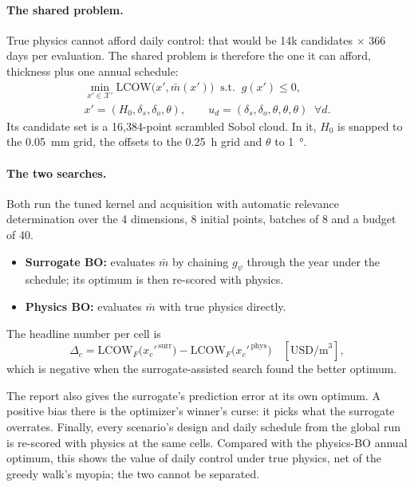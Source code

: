 \documentclass[11pt]{article}
\begin{document}
\paragraph{The shared problem.} True physics cannot afford daily control: that would be
14k candidates $\times$ 366 days per evaluation. The shared problem is therefore the one it
can afford, thickness plus one annual schedule:
\begin{equation}
\begin{gathered}
\min_{x' \in \mathcal{X}'} \mathrm{LCOW}\bigl(x', \bar m(x')\bigr) \;\;\text{s.t.}\;\; g(x') \le 0, \\
x' = (H_0, \delta_s, \delta_o, \theta), \qquad u_d = (\delta_s, \delta_o, \theta, \theta, \theta)\;\; \forall d .
\end{gathered}
\end{equation}
Its candidate set is a 16,384-point scrambled Sobol cloud. In it, $H_0$ is snapped to the
\SI{0.05}{\milli\metre} grid, the offsets to the \SI{0.25}{\hour} grid and $\theta$ to
\SI{1}{\degree}.

\paragraph{The two searches.} Both run the tuned kernel and acquisition with automatic
relevance determination over the 4 dimensions, 8 initial points, batches of 8 and a budget of
40.
\begin{itemize}
\item \textbf{Surrogate BO:} evaluates $\bar m$ by chaining $g_\psi$ through the year under the
schedule; its optimum is then re-scored with physics.
\item \textbf{Physics BO:} evaluates $\bar m$ with true physics directly.
\end{itemize}
The headline number per cell is
\begin{equation}
\Delta_c = \mathrm{LCOW}_F\bigl(x_c'^{\,\text{surr}}\bigr) - \mathrm{LCOW}_F\bigl(x_c'^{\,\text{phys}}\bigr)
\quad [\text{USD/m}^3],
\end{equation}
which is negative when the surrogate-assisted search found the better optimum.

The report also gives the surrogate's prediction error at its own optimum. A positive bias
there is the optimizer's winner's curse: it picks what the surrogate overrates. Finally,
every scenario's design and daily schedule from the global run is re-scored with physics at
the same cells. Compared with the physics-BO annual optimum, this shows the value of daily
control under true physics, net of the greedy walk's myopia; the two cannot be separated.
\end{document}
